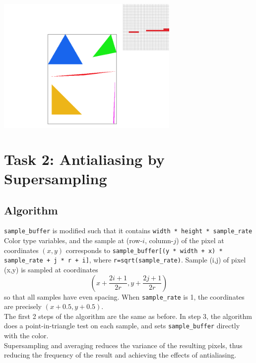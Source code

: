 \documentclass[11pt]{article}
\begin{document}
\includegraphics[width=250pt]{screenshot_2-15_3-21-33.png}

\section{Task 2: Antialiasing by Supersampling}
\subsection{Algorithm}
\par\verb|sample_buffer| is modified such that it contains \verb|width * height * sample_rate| Color type variables, and the sample at (row-$i$, column-$j$) of the pixel at coordinates $(x,y)$ corresponds to \verb|sample_buffer[(y * width + x) * sample_rate + j * r + i]|, where \verb|r=sqrt(sample_rate)|. Sample (i,j) of pixel (x,y) is sampled at coordinates $$(x+\frac{2i+1}{2r},y+\frac{2j+1}{2r})$$so that all samples have even spacing. When \verb|sample_rate| is 1, the coordinates are precisely $(x+0.5,y+0.5)$.
\\The first 2 steps of the algorithm are the same as before. In step 3, the algorithm does a point-in-triangle test on each sample, and sets \verb|sample_buffer| directly with the color.\\
Supersampling and averaging reduces the variance of the resulting pixels, thus reducing the frequency of the result and achieving the effects of antialiasing.
\end{document}

